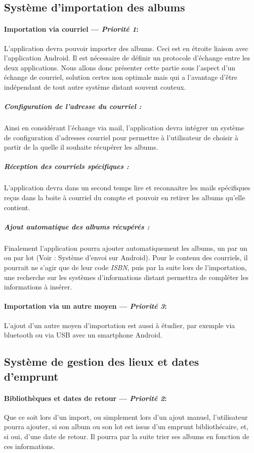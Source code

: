 \subsection{Système d'importation des albums}
\paragraph{Importation via courriel ---  \textit{Priorité 1}:}
L'application devra pouvoir importer des albums. 
Ceci est en étroite liaison avec l'application Android. Il est nécessaire de définir un protocole d'échange entre les deux applications. Nous allons donc présenter cette partie sous l'aspect d'un échange de courriel, solution certes non optimale mais qui a l'avantage d'être indépendant de tout autre système distant souvent couteux.

\subparagraph{Configuration de l'adresse du courriel :}  
Ainsi en considérant l'échange via mail, l'application devra intégrer un système de configuration d'adresses courriel pour permettre à l'utilisateur de choisir à partir de la quelle il souhaite récupérer les albums.

\subparagraph{Réception des courriels spécifiques :}  
L'application devra dans un second temps lire et reconnaitre les mails spécifiques reçus dans la boite à courriel du compte et pouvoir en retirer les albums qu'elle contient.

\subparagraph{Ajout automatique des albums récupérés :}  
Finalement l'application pourra ajouter automatiquement les albums, un par un ou par lot (Voir : Système d'envoi sur Android). 
Pour le contenu des courriels, il pourrait ne s'agir que de leur code \emph{ISBN}, puis par la suite lors de l'importation, une recherche sur les systèmes d'informations distant permettra de compléter les informations à insérer.
\paragraph{Importation via un autre moyen ---  \textit{Priorité 3}:}  
L'ajout d'un autre moyen d'importation est aussi à étudier, par exemple via bluetooth ou via USB avec un smartphone Android.

\subsection{Système de gestion des lieux et dates d'emprunt}
\paragraph{Bibliothèques et dates de retour ---  \textit{Priorité 2}:}
Que ce soit lors d'un import, ou simplement lors d'un ajout manuel, l'utilisateur pourra ajouter, si son album ou son lot est issus d'un emprunt bibliothécaire, et, si oui, d'une date de retour. 
Il pourra par la suite trier ses albums en fonction de ces informations.

